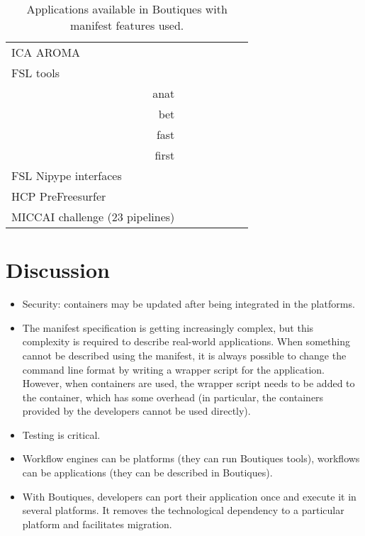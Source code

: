 \documentclass{article}
\begin{document}
\begin{table}
\begin{tabular}{l|ccc|ccc}
    ICA AROMA                       &\cellcolor{gray!75} &            &         &              &&\\
    FSL tools &&&&&\\
    \multicolumn{1}{r|}{anat}       &                    &            &         &              &&\\
    \multicolumn{1}{r|}{bet}        &                    &            &         &              &&\\
    \multicolumn{1}{r|}{fast}       &                    &            &         &              &&\\
    \multicolumn{1}{r|}{first}      &                    &            &         &              &&\\
    FSL Nipype interfaces     \\
    HCP PreFreesurfer               &\cellcolor{gray!75} &            &         &             &&\\
    MICCAI challenge (23 pipelines) &\cellcolor{gray!75} &            &         &             &&\\
  \end{tabular} 
  \caption{Applications available in Boutiques with manifest features used.}
  \label{table:applications}
\end{table}

\section{Discussion}

\begin{itemize}
\item Security: containers may be updated after being integrated in the platforms.
\item The manifest specification is getting increasingly complex, but
  this complexity is required to describe real-world
  applications. When something cannot be described using the manifest,
  it is always possible to change the command line format by writing a
  wrapper script for the application. However, when containers are
  used, the wrapper script needs to be added to the container, which
  has some overhead (in particular, the containers provided by the
  developers cannot be used directly).
\item Testing is critical.
\item Workflow engines can be platforms (they can run Boutiques tools), workflows can be applications (they can be described in Boutiques).
\item With Boutiques, developers can port their application once and execute it in several platforms. It removes the technological dependency to a particular platform and facilitates migration. 
\end{itemize}
\end{document}
